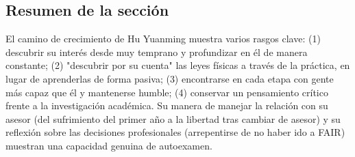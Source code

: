 \subsection{Resumen de la sección}

El camino de crecimiento de Hu Yuanming muestra varios rasgos clave: (1) descubrir su interés desde muy temprano y profundizar en él de manera constante; (2) "descubrir por su cuenta" las leyes físicas a través de la práctica, en lugar de aprenderlas de forma pasiva; (3) encontrarse en cada etapa con gente más capaz que él y mantenerse humble; (4) conservar un pensamiento crítico frente a la investigación académica. Su manera de manejar la relación con su asesor (del sufrimiento del primer año a la libertad tras cambiar de asesor) y su reflexión sobre las decisiones profesionales (arrepentirse de no haber ido a FAIR) muestran una capacidad genuina de autoexamen.
